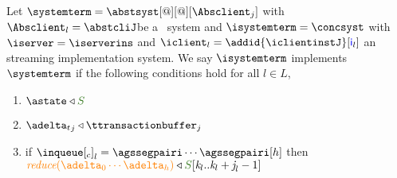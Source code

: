 \begin{definition} \label{def:implementation}
Let  $\systemterm = \abstsyst[@][@][\Absclient_j]$ with $\Absclient_l={\abstcliJ}$be a \tgspcalculus\ system and 
$\isystemterm = \concsyst $  with $\iserver = \iserverins$ and $\iclient_l = \addid{\iclientinstJ}[{\cid{_l}}]$ 
an streaming implementation
system. We say $\isystemterm$ implements $\systemterm$ if the following conditions hold for all $l \in L$,

\begin{enumerate}
	\item \label{prop_stateserver} $\astate \triangleleft \queuemessage$
	\item \label{prop_transactions} ${\transactionbuffer}_j\triangleleft{\ttransactionbuffer}_j$ 
	\item {}	\label{prop_inclient}
	if ${\inclient}_l = \agssegpairi \cdots \agssegpairi[h]$ then $\ireduce{\adelta_0\cdots\adelta_h}\triangleleft  \queuemessage[\tknown_l..\tknown_l+\treceivebuffer_l-1]$
	

\end{enumerate}
\end{definition}
